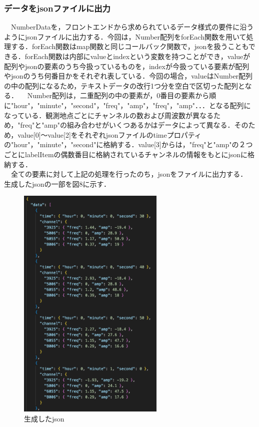  \subsubsection{データをjsonファイルに出力}
　NumberDataを，フロントエンドから求められているデータ様式の要件に沿うようにjsonファイルに出力する．今回は，Number配列をforEach関数を用いて処理する．forEach関数はmap関数と同じコールバック関数で，jsonを扱うこともできる．forEach関数は内部にvalueとindexという変数を持つことができ，valueが配列やjsonの要素のうち今扱っているものを，indexが今扱っている要素が配列やjsonのうち何番目かをそれぞれ表している．今回の場合，valueはNumber配列の中の配列になるため，テキストデータの改行1つ分を空白で区切った配列となる．
　Number配列は，二重配列の中の要素が，0番目の要素から順に"hour"，"minute"，"second"，"freq"，"amp"，"freq"，"amp"．．．となる配列になっている．観測地点ごとにチャンネルの数および周波数が異なるため，"freq"と"amp"の組み合わせがいくつあるかはデータによって異なる．そのため，value[0]〜value[2]をそれぞれjsonファイルのtimeプロパティの"hour"，"minute"，"second"に格納する．value[3]からは，"freq"と"amp"の２つごとにlabelItemの偶数番目に格納されているチャンネルの情報をもとにjsonに格納する．\\
　全ての要素に対して上記の処理を行ったのち，jsonをファイルに出力する．\\
生成したjsonの一部を図8に示す．\\
\begin{figure}[ht]
  \centering
  \includegraphics[width=70mm]{fig/jsonData.png}
  \caption{生成したjson}
\end{figure}
